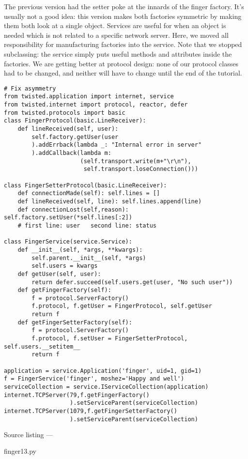 The previous version had the setter poke at the innards of the finger factory. It's usually not a good idea: this version makes both factories symmetric by making them both look at a single object. Services are useful for when an object is needed which is not related to a specific network server. Here, we moved all responsibility for manufacturing factories into the service. Note that we stopped subclassing: the service simply puts useful methods and attributes inside the factories. We are getting better at protocol design: none of our protocol classes had to be changed, and neither will have to change until the end of the tutorial.\begin{verbatim}
# Fix asymmetry
from twisted.application import internet, service
from twisted.internet import protocol, reactor, defer
from twisted.protocols import basic
class FingerProtocol(basic.LineReceiver):
    def lineReceived(self, user):
        self.factory.getUser(user
        ).addErrback(lambda _: "Internal error in server"
        ).addCallback(lambda m:
                      (self.transport.write(m+"\r\n"),
                       self.transport.loseConnection()))

class FingerSetterProtocol(basic.LineReceiver):
    def connectionMade(self): self.lines = []
    def lineReceived(self, line): self.lines.append(line)
    def connectionLost(self,reason): self.factory.setUser(*self.lines[:2])
    # first line: user   second line: status

class FingerService(service.Service):
    def __init__(self, *args, **kwargs):
        self.parent.__init__(self, *args)
        self.users = kwargs
    def getUser(self, user):
        return defer.succeed(self.users.get(user, "No such user"))
    def getFingerFactory(self):
        f = protocol.ServerFactory()
        f.protocol, f.getUser = FingerProtocol, self.getUser
        return f
    def getFingerSetterFactory(self):
        f = protocol.ServerFactory()
        f.protocol, f.setUser = FingerSetterProtocol, self.users.__setitem__
        return f

application = service.Application('finger', uid=1, gid=1)
f = FingerService('finger', moshez='Happy and well')
serviceCollection = service.IServiceCollection(application)
internet.TCPServer(79,f.getFingerFactory()
                   ).setServiceParent(serviceCollection)
internet.TCPServer(1079,f.getFingerSetterFactory()
                   ).setServiceParent(serviceCollection)
\end{verbatim}\parbox[b]{\linewidth}{\begin{center}Source listing --- \begin{em}finger13.py\end{em}\end{center}}

